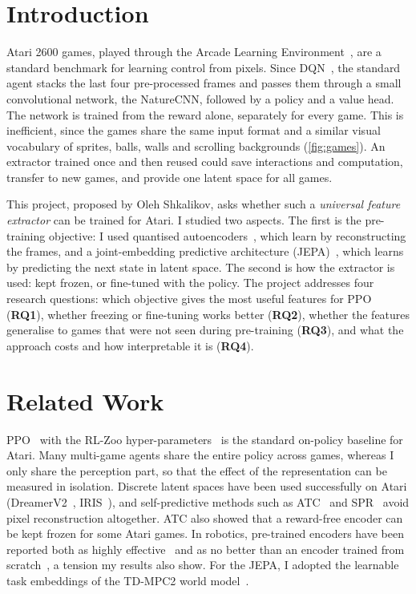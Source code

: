 \documentclass[runningheads]{llncs}
\begin{document}
\section{Introduction}
\label{sec:intro}

Atari 2600 games, played through the Arcade Learning Environment~\cite{machado2018revisiting},
are a standard benchmark for learning control from pixels. Since
DQN~\cite{mnih2015human}, the standard agent stacks the last four pre-processed frames and
passes them through a small convolutional network, the NatureCNN, followed by a policy and a
value head. The network is trained from the reward alone, separately for every game. This is
inefficient, since the games share the same input
format and a similar visual vocabulary of sprites, balls, walls and scrolling backgrounds
(\cref{fig:games}). An extractor trained once and then reused could save interactions and computation,
transfer to new games, and provide one latent space for all games.

This project, proposed by Oleh Shkalikov, asks whether such a \emph{universal feature
extractor} can be trained for Atari. I studied two aspects. The first is the pre-training objective: I used quantised
autoencoders~\cite{vandenoord2017vqvae,mentzer2024fsq}, which learn by reconstructing the
frames, and a joint-embedding predictive architecture
(JEPA)~\cite{lecun2022path,assran2023ijepa,bardes2024vjepa}, which learns by predicting the
next state in latent space. The second is how the extractor is used: kept frozen, or fine-tuned with the policy. The
project addresses four research questions: which objective gives the most useful features for PPO (\textbf{RQ1}), whether
freezing or fine-tuning works better (\textbf{RQ2}), whether the features generalise to games
that were not seen during pre-training (\textbf{RQ3}), and what the approach costs and
how interpretable it is (\textbf{RQ4}).

\section{Related Work}
\label{sec:related}

PPO~\cite{schulman2017ppo} with the RL-Zoo hyper-parameters~\cite{raffin2020zoo} is the
standard on-policy baseline for Atari. Many multi-game agents share the entire policy across games, whereas I only share the
perception part, so that the effect of the representation can be measured in isolation. Discrete latent spaces have been used
successfully on Atari (DreamerV2~\cite{hafner2021dreamerv2}, IRIS~\cite{micheli2023iris}), and
self-predictive methods such as ATC~\cite{stooke2021atc} and SPR~\cite{schwarzer2021spr} avoid
pixel reconstruction altogether. ATC also showed that a reward-free encoder can be kept frozen for some Atari games. In robotics, pre-trained encoders have been reported both
as highly effective~\cite{parisi2022pvr} and as no better than an encoder trained from
scratch~\cite{hansen2022pretrained}, a tension my results also show. For the JEPA, I
adopted the learnable task embeddings of the TD-MPC2 world model~\cite{hansen2024tdmpc2}.
\end{document}
